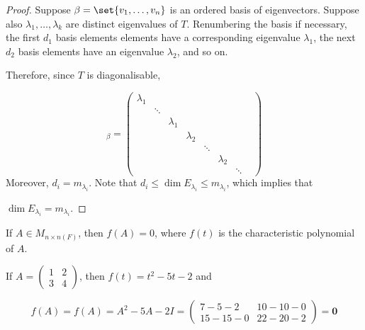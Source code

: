 \documentclass[11pt]{scrartcl}
\begin{document}
\begin{proof}
  Suppose $\beta = \set{v_1, \dots, v_n}$ is an ordered basis of
  eigenvectors. Suppose also $\lambda_1, \dots, \lambda_{k}$ are
  distinct eigenvalues of $T$. Renumbering the basis if necessary, the
  first $d_{1}$ basis elements elements have a corresponding
  eigenvalue $\lambda_{1}$, the next $d_{2}$ basis elements have an
  eigenvalue $\lambda_{2}$, and so on.

  Therefore, since $T$ is diagonalisable,


  \begin{equation*}
    [T]_{\beta} = \begin{pmatrix}
      \lambda_{1} &        &            &            &        &            &    \\
      & \ddots &            &            &        &            &    \\
      &        & \lambda_{1} &            &        &            &    \\
      &        &            & \lambda_{2} &        &            &  & \\
      &        &            &            & \ddots &            &  & \\
      &        &            &            &        & \lambda_{2} &    \\
      &        &            &            &        &            & \ddots
    \end{pmatrix}
  \end{equation*}
  Moreover, $d_{i} = m_{\lambda_{i}}$. Note that  $d_i \leq \dim E_{\lambda_i} \leq m_{\lambda_i}$, which implies that

  $\dim E_{\lambda_i} = m_{\lambda_i}$.
\end{proof}

\begin{theorem}
  If $A\in M_{n\times n(F)}$, then $f(A) = 0$, where $f(t)$ is the
  characteristic polynomial of $A$.
\end{theorem}
\begin{example}

If $A = \begin{pmatrix}
1 & 2\\
3 & 4
\end{pmatrix}$, then $f(t) = t^2 - 5t - 2$ and

\begin{equation*}
f(A) = f(A) = A^2-5A-2I = \begin{pmatrix}
  7 - 5 - 2 & 10 - 10 - 0\\
  15 -15 - 0 & 22 -20 -2
\end{pmatrix} = \bm{0}
\end{equation*}
\end{example}
\end{document}
